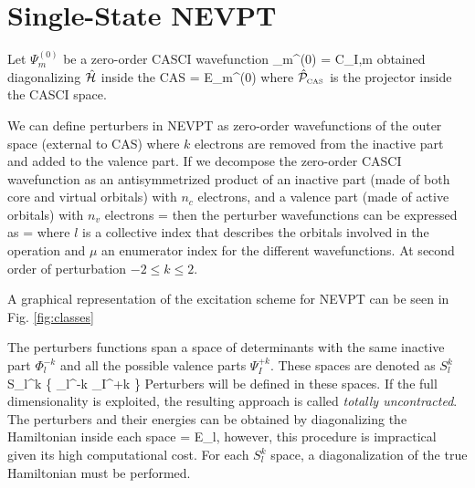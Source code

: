 \section{Single-State NEVPT}

Let $\Psi_m^{(0)}$ be a zero-order CASCI wavefunction
\beq
\Psi_m^{(0)} =  C_{I,m} 
\eeq
obtained diagonalizing $\hat{\mathcal{H}}$ inside the CAS
\beq
{}\ham{} = E_m^{(0)} 
\eeq
where $\hat{\mathcal{P}}_{\mbox{\tiny CAS}}$ is the projector inside the CASCI space. 

We can define perturbers in NEVPT as zero-order wavefunctions of the outer
space (external to CAS) where $k$ electrons are removed from the inactive
part and added to the valence part. If we decompose the zero-order CASCI
wavefunction as an antisymmetrized product of an inactive part (made of both
core and virtual orbitals) with $n_c$ electrons, and a valence part (made of
active orbitals) with $n_v$ electrons
\beq
{} = 
\eeq
then the perturber wavefunctions can be expressed as
\beq
{} = 
\eeq
where $l$ is a collective index that describes the orbitals involved in the
operation and $\mu$ an enumerator index for the different wavefunctions. At
second order of perturbation $-2 \le k \le 2$.  

A graphical representation of the excitation scheme for NEVPT can be seen in
Fig. \ref{fig:classes}



The perturbers functions span a space of determinants with the same inactive
part $\Phi_l^{-k}$ and all the possible valence parts $\Psi_I^{+k}$. These
spaces are denoted as $S_l^k$
\beq
S_{l}^{k} \equiv \left\{ \Phi_l^{-k} \Psi_I^{+k} \right\}
\eeq
Perturbers will be defined in these spaces. If the full dimensionality
is exploited, the resulting approach is called \textit{totally
uncontracted}. The perturbers and their energies can be obtained by
diagonalizing the Hamiltonian inside each space
\beq
\label{eqn:teoria1_1}
\ham{}  = E_{l,\mu}
\eeq
however, this procedure is impractical given its high computational cost.
For each $S_l^k$ space, a diagonalization of the true Hamiltonian must be performed.

